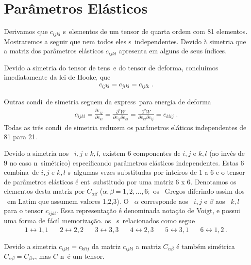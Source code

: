\section{Par\^ametros El\'asticos}

Derivamos que $c_{ijkl}$ s\ao\ elementos de um
tensor de quarta ordem com 81 elementos. Mostraremos a seguir 
que nem todos eles s\ao\ independentes. Devido \`a
simetria que a matriz dos par\^ametros el\'asticos $c_{ijkl}$ 
apresenta em alguns de seus \'indices.

Devido a simetria do tensor de tens\ao\ e do tensor de
deforma\cao, conclu\'imos imediatamente da lei de Hooke, que
\begin{eqnarray}
c_{ijkl} = c_{jikl} = c_{ijlk} \; .
\end{eqnarray}

Outras condi\coes\ de simetria seguem da express\ao\ para
energia de deforma\cao
\begin{eqnarray}
c_{ijkl} = \frac{\partial \tau_{ij}}{\partial e_{kl}}
= \frac{\partial^2 W}{\partial e_{ij} \partial e_{kl}}
= \frac{\partial^2 W}{\partial e_{kl} \partial e_{ij}}
= c_{klij} \; .
\end{eqnarray}
Todas as tr\^es condi\coes\ de simetria reduzem os
par\^ametros el\'aticos independentes de 81 para 21.

Devido a simetria nos \indices\ $i,j$ e $k,l$, existem
6 componentes de $i,j$ e $k,l$ (ao inv\'es  de 9 no caso
n\ao\ sim\'etrico) especificando par\^ametros el\'asticos
independentes. Estas 6 combina\coes\ de $i,j$ e $k,l$
s\ao\ algumas vezes substitu\ih das por inteiros de 1 a 6
e o tensor de par\^ametros el\'asticos \'e ent\ao\
substitu\ih do por uma matriz 6 x 6. Denotamos os
elementos desta matriz por $C_{\alpha \beta}$ ($\alpha,
\beta = 1,2,...,6;$ os \indices\ Gregos diferindo assim
dos \indices\ em Latim que assumem valores 1,2,3). O
\indice\ $\alpha$ corresponde aos \indices\ $i,j$ e 
$\beta$ aos \indices\ $k,l$ para o tensor $c_{ijkl}$. Essa
representa\c{c}\~ao \'e denominada nota\c{c}\~ao de Voigt, e possui
uma forma de f\'acil memoriza\c{c}\~ao.
os \indices\ s\ao\ relacionados como segue
\begin{eqnarray*}
1 \leftrightarrow 1,1 \;\;\;\;\;\;
2 \leftrightarrow 2,2 \;\;\;\;\;\;
3 \leftrightarrow 3,3 \;\;\;\;\;\;
4 \leftrightarrow 2,3 \;\;\;\;\;\;
5 \leftrightarrow 3,1 \;\;\;\;\;\;
6 \leftrightarrow 1,2 \;.
\end{eqnarray*} 

Devido a simetria $c_{ijkl} = c_{klij}$ da matriz
$c_{ijkl}$ a matriz $C_{\alpha \beta}$ \'e tamb\'em
sim\'etrica $C_{\alpha \beta} = C_{\beta \alpha}$, mas $C$
n\ao\ \'e um tensor.

